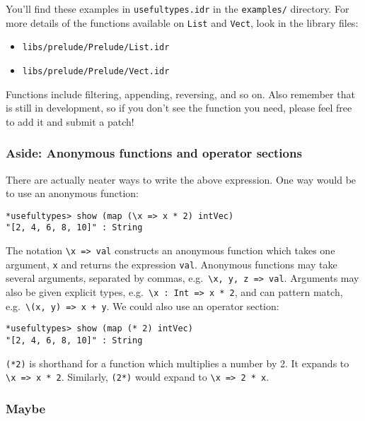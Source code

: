 \noindent
You'll find these examples in \texttt{usefultypes.idr} in the \texttt{examples/} directory.
For more details of the functions available on \texttt{List} and \texttt{Vect}, look in the library files:

\begin{itemize}
\item\texttt{libs/prelude/Prelude/List.idr}
\item\texttt{libs/prelude/Prelude/Vect.idr}
\end{itemize}

\noindent
Functions include filtering, appending, reversing, and so on.
Also remember that \Idris{} is still in development, so if you don't see the function you need, please feel free to add it and submit a patch!

\subsubsection*{Aside: Anonymous functions and operator sections}

There are actually neater ways to write the above expression.
One way would be to use an anonymous function:

\begin{lstlisting}[style=stdout]
*usefultypes> show (map (\x => x * 2) intVec)
"[2, 4, 6, 8, 10]" : String
\end{lstlisting}


\noindent
The notation \lstinline!\x => val! constructs an anonymous function which takes one argument, \texttt{x} and returns the expression \texttt{val}.
Anonymous functions may take several arguments, separated by commas, e.g.\ \lstinline!\x, y, z => val!.
Arguments may also be given explicit types, e.g.\ \lstinline!\x : Int => x * 2!, and can pattern match, e.g.\ \lstinline!\(x, y) => x + y!.
We could also use an operator section:

\begin{lstlisting}[style=stdout]
*usefultypes> show (map (* 2) intVec)
"[2, 4, 6, 8, 10]" : String
\end{lstlisting}


\noindent
\lstinline!(*2)! is shorthand for a function which multiplies a number by 2.
It expands to \lstinline!\x => x * 2!. 
Similarly, \texttt{(2*)} would expand to \lstinline!\x => 2 * x!.

\subsubsection{Maybe}

